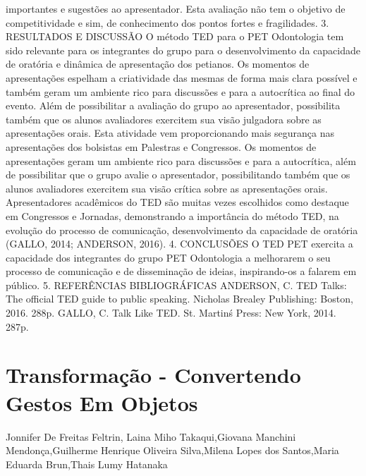importantes e sugestões ao apresentador. Esta avaliação não tem o objetivo de competitividade e
sim, de conhecimento dos pontos fortes e fragilidades.
3. RESULTADOS E DISCUSSÃO
O método TED para o PET Odontologia tem sido relevante para os integrantes do grupo para
o desenvolvimento da capacidade de oratória e dinâmica de apresentação dos petianos. Os
momentos de apresentações espelham a criatividade das mesmas de forma mais clara possível e
também geram um ambiente rico para discussões e para a autocrítica ao final do evento. Além de
possibilitar a avaliação do grupo ao apresentador, possibilita também que os alunos avaliadores
exercitem sua visão julgadora sobre as apresentações orais. Esta atividade vem proporcionando
mais segurança nas apresentações dos bolsistas em Palestras e Congressos.
Os momentos de apresentações geram um ambiente rico para discussões e para a autocrítica,
além de possibilitar que o grupo avalie o apresentador, possibilitando também que os alunos
avaliadores exercitem sua visão crítica sobre as apresentações orais.
Apresentadores acadêmicos do TED são muitas vezes escolhidos como destaque em
Congressos e Jornadas, demonstrando a importância do método TED, na evolução do processo de
comunicação, desenvolvimento da capacidade de oratória (GALLO, 2014; ANDERSON, 2016).
4. CONCLUSÕES
O TED PET exercita a capacidade dos integrantes do grupo PET Odontologia a melhorarem
o seu processo de comunicação e de disseminação de ideias, inspirando-os a falarem em público.
5. REFERÊNCIAS BIBLIOGRÁFICAS
ANDERSON, C. TED Talks: The official TED guide to public speaking. Nicholas Brealey
Publishing: Boston, 2016. 288p.
GALLO, C. Talk Like TED. St. Martin\'s Press: New York, 2014. 287p.




\section*{Transformação - Convertendo Gestos Em Objetos}

Jonnifer De Freitas Feltrin, Laina Miho Takaqui,Giovana Manchini Mendonça,Guilherme Henrique Oliveira Silva,Milena Lopes dos Santos,Maria Eduarda Brun,Thais Lumy Hatanaka

